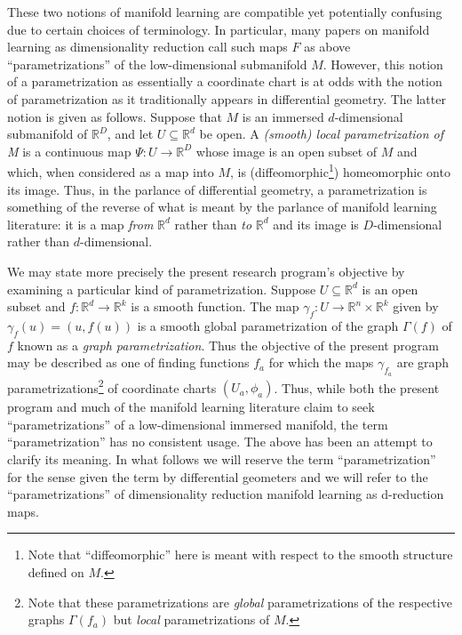 \documentclass[11pt]{article}
\newcommand{\R}{\ensuremath{\mathbb{R}}}
\numberwithin{equation}{section}
\begin{document}
These two notions of manifold learning are compatible yet potentially confusing due to certain choices of terminology. In particular, many papers on manifold learning as dimensionality reduction call such maps $F$ as above ``parametrizations'' of the low-dimensional submanifold $M$. However, this notion of a parametrization as essentially a coordinate chart is at odds with the notion of parametrization as it traditionally appears in differential geometry. The latter notion is given as follows. Suppose that $M$ is an immersed $d$-dimensional submanifold of $\R^D$, and let $U \subseteq \R^d$ be open. A \emph{(smooth) local parametrization of M} is a continuous map $\Psi: U \to \R^D$ whose image is an open subset of $M$ and which, when considered as a map into $M$, is (diffeomorphic\footnote{Note that ``diffeomorphic'' here is meant with respect to the smooth structure defined on $M$.}) homeomorphic onto its image. Thus, in the parlance of differential geometry, a parametrization is something of the reverse of what is meant by the parlance of manifold learning literature: it is a map \emph{from} $\R^d$ rather than \emph{to} $\R^d$ and its image is $D$-dimensional rather than $d$-dimensional.

We may state more precisely the present research program's objective by examining a particular kind of parametrization. Suppose $U \subseteq \R^d$ is an open subset and $f: \R^d \to \R^k$ is a smooth function. The map $\gamma_f: U \to \R^n \times \R^k$ given by $\gamma_f(u) = (u, f(u))$ is a smooth global parametrization of the graph $\Gamma(f)$ of $f$ known as a \emph{graph parametrization}. Thus the objective of the present program may be described as one of finding functions $f_a$ for which the maps $\gamma_{f_a}$ are graph parametrizations\footnote{Note that these parametrizations are \emph{global} parametrizations of the respective graphs $\Gamma(f_a)$ but \emph{local} parametrizations of $M$.} of coordinate charts $(U_a, \phi_a)$. Thus, while both the present program and much of the manifold learning literature claim to seek ``parametrizations'' of a low-dimensional immersed manifold, the term ``parametrization'' has no consistent usage. The above has been an attempt to clarify its meaning. In what follows we will reserve the term ``parametrization'' for the sense given the term by differential geometers and we will refer to the ``parametrizations'' of dimensionality reduction manifold learning as d-reduction maps. 
\end{document}
